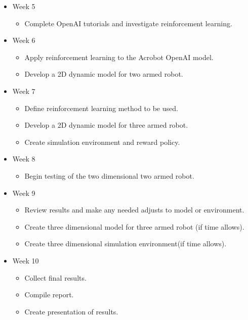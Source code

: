 \documentclass{article}
\begin{document}
\begin{itemize}
    \item Week 5%
    \begin{itemize}
        \item Complete OpenAI tutorials and investigate reinforcement learning.
    \end{itemize}
    \item Week 6 %
    \begin{itemize}
        \item Apply reinforcement learning to the Acrobot OpenAI model.
        \item Develop a 2D dynamic model for two armed robot.
    \end{itemize}
    \item Week 7%
    \begin{itemize}
        \item Define reinforcement learning method to be used.
        \item Develop a 2D dynamic model for three armed robot.
        \item Create simulation environment and reward policy.
    \end{itemize}
    \item Week 8 %
    \begin{itemize}
        \item Begin testing of the two dimensional two armed robot.
    \end{itemize}
    \item Week 9%
    \begin{itemize}
        \item Review results and make any needed adjusts to model or environment.
        \item Create three dimensional model for three armed robot (if time allows).
        \item Create three dimensional simulation environment(if time allows).
    \end{itemize}
    \item Week 10%
    \begin{itemize}
        \item Collect final results.
        \item Compile report.
        \item Create presentation of results.
    \end{itemize}
\end{itemize}



\end{document}
